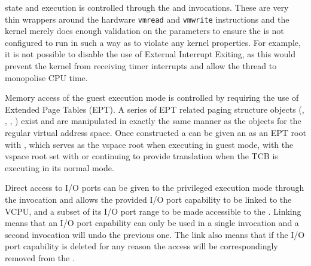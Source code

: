  state and execution is controlled through the 
and  invocations.
These are very thin wrappers around the hardware \texttt{vmread} and \texttt{vmwrite} instructions and the kernel
merely does enough validation on the parameters to ensure the  is not configured
to run in such a way as to violate any kernel properties. For example, it is not possible to
disable the use of External Interrupt Exiting, as this would prevent the kernel from receiving
timer interrupts and allow the thread to monopolise CPU time.

Memory access of the guest execution mode is controlled by requiring the use of Extended
Page Tables (EPT). A series of EPT related paging structure objects (, , , )
exist and are manipulated in exactly the same manner as the objects for the regular virtual
address space. Once constructed a  can be given an  as an EPT root with ,
which serves as the vspace root when executing in guest mode, with the vspace root set
with  or 
continuing to provide translation when the TCB is executing in its normal mode.

Direct access to I/O ports can be given to the privileged execution mode through the
 invocation and allows the provided I/O port capability to be
linked to the VCPU, and a subset of its I/O port range to be made accessible to the .
Linking means that an I/O port capability can only be used in a single 
invocation and a second invocation will undo the previous one. The link also means that
if the I/O port capability is deleted for any reason the access will be correspondingly removed
from the .

